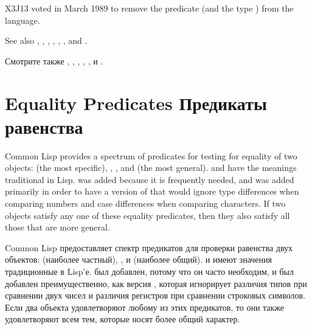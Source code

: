 \begin{newer}
X3J13 voted in March 1989
to remove the predicate  (and the type ) from the
language.
\end{newer}

\medskip

See also , ,
, ,
,
, and .

Смотрите также , ,
, ,
,
 и .

\section{Equality Predicates Предикаты равенства}

Common Lisp provides a spectrum of predicates for testing for equality of
two objects:  (the most specific), , , and 
(the most general).   and  have the meanings traditional
in Lisp.   was added because it is frequently needed, and
 was added primarily in order to have a version of 
that would ignore type differences when comparing numbers
and case differences when comparing characters.
If two objects satisfy any one of these equality predicates,
then they also satisfy all those that are more general.

Common Lisp предоставляет спектр предикатов для проверки равенства двух
объектов:   (наиболее частный), ,  и 
(наиболее общий).  и  имеют значения традиционные в
Lisp'е.  был добавлен, потому что он часто необходим, и 
был добавлен преимущественно, как версия , которая игнорирует
различия типов при сравнении двух чисел и различия регистров при сравнении
строковых символов.
Если два объекта удовлетворяют любому из этих предикатов, то они
также удовлетворяют всем тем, которые носят более общий характер.

